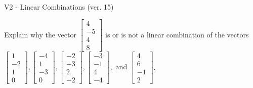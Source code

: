 \begin{exercise}
  \begin{exerciseTitle}V2 - Linear Combinations (ver. 15)\end{exerciseTitle}
  \begin{exerciseStatement}
    Explain why the vector \(\left[\begin{array}{c}
4 \\
-5 \\
4 \\
8
\end{array}\right]\)  is or is not a linear 
	combination of the vectors \(\left[\begin{array}{c}
1 \\
-2 \\
1 \\
0
\end{array}\right] , \left[\begin{array}{c}
-4 \\
1 \\
-3 \\
0
\end{array}\right] , \left[\begin{array}{c}
-2 \\
-3 \\
2 \\
-2
\end{array}\right] , \left[\begin{array}{c}
-3 \\
-1 \\
4 \\
-4
\end{array}\right] , \text{ and } \left[\begin{array}{c}
4 \\
6 \\
-1 \\
2
\end{array}\right]\).
	



\end{exerciseStatement}
\end{exercise}
